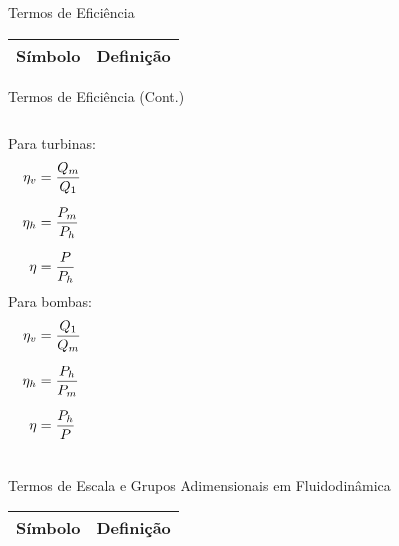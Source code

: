     \begin{frame}{Termos de Eficiência}\vspace*{-1em}
        \setlength{\tabcolsep}{2mm}
        \noindent\begin{longtable}{cp{110mm}}
            \alert{Símbolo} & \alert{Definição} \\
            \hline
            \hline
        \end{longtable}
    \end{frame}

    \begin{frame}{Termos de Eficiência (Cont.)}\vspace*{-1em}
        \begin{columns}
            Para turbinas:
            \begin{align*}
                \eta_v &= \dfrac{Q_m}{Q_1} \\[\medskipamount]
                \eta_h &= \dfrac{P_m}{P_h} \\[\medskipamount]
                \eta &= \dfrac{P}{P_h}
            \end{align*}
            Para bombas:
            \begin{align*}
                \eta_v &= \dfrac{Q_1}{Q_m} \\[\medskipamount]
                \eta_h &= \dfrac{P_h}{P_m} \\[\medskipamount]
                \eta &= \dfrac{P_h}{P}
            \end{align*}
        \end{columns}
    \end{frame}

    \begin{frame}{Termos de Escala e Grupos Adimensionais em Fluidodinâmica}\vspace*{-1em}
        \setlength{\tabcolsep}{2mm}
        \noindent\begin{longtable}{cp{110mm}}
            \alert{Símbolo} & \alert{Definição} \\
            \hline
            \hline
        \end{longtable}
    \end{frame}

